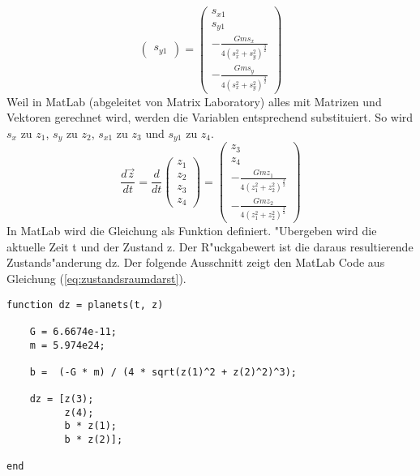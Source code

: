\begin{refsection}
\begin{equation}
\begin{pmatrix}
s_{y1}
\end{pmatrix} = \begin{pmatrix}
s_{x1} \\ 
s_{y1}\\
-\frac{G m s_x}{4(s_x^2 + s_y^2)^\frac32} \\
-\frac{G m s_y}{4(s_x^2 + s_y^2)^\frac32}
\end{pmatrix}
\end{equation}
Weil in MatLab (abgeleitet von Matrix Laboratory) alles mit Matrizen und Vektoren gerechnet wird, werden die Variablen entsprechend substituiert. So wird $s_x$ zu $z_1$, $s_y$ zu $z_2$, $s_{x1}$ zu $z_3$ und $s_{y1}$ zu $z_4$.
\begin{equation}\label{eq:zustandsraumdarst}
\frac{d \vec{z}}{dt}=\frac{d}{dt} \begin{pmatrix}
z_1 \\ 
z_2 \\
z_3 \\
z_4
\end{pmatrix} = \begin{pmatrix}
z_3 \\ 
z_4 \\
-\frac{G m z_1}{4(z_1^2 + z_2^2)^\frac32} \\
-\frac{G m z_2}{4(z_1^2 + z_2^2)^\frac32}
\end{pmatrix}
\end{equation}
In MatLab wird die Gleichung als Funktion definiert.
"Ubergeben wird die aktuelle Zeit t und der Zustand z.
Der R"uckgabewert ist die daraus resultierende  Zustands"anderung dz.
Der folgende Ausschnitt zeigt den MatLab Code aus Gleichung (\ref{eq:zustandsraumdarst}).
\begin{lstlisting}[style=Matlab]
function dz = planets(t, z)

    G = 6.6674e-11;
    m = 5.974e24;

    b =  (-G * m) / (4 * sqrt(z(1)^2 + z(2)^2)^3);
    
    dz = [z(3);
          z(4);
          b * z(1);
          b * z(2)];
      
end
\end{lstlisting}







\printbibliography[heading=subbibliography]
\end{refsection}


